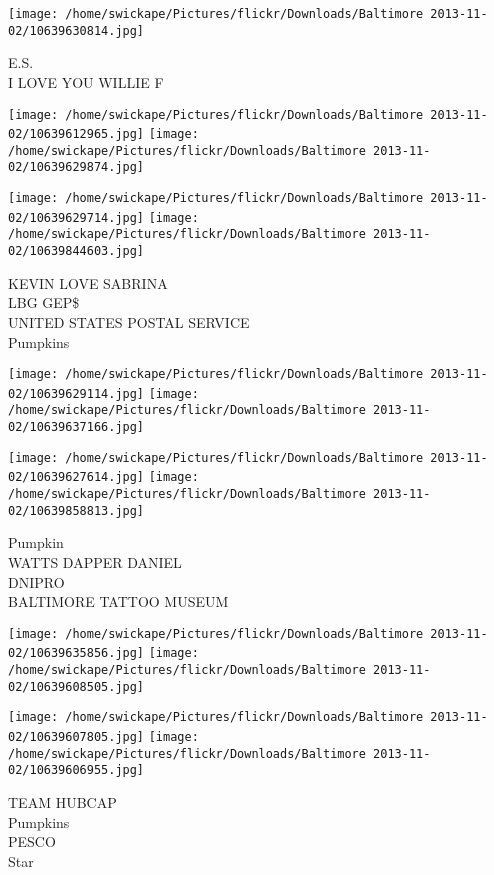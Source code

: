 \documentclass[10pt,letterpaper]{article}
\begin{document}
\vspace{0.25in}
\texttt{[image: /home/swickape/Pictures/flickr/Downloads/Baltimore 2013-11-02/10639630814.jpg]}

E.S.\\
I LOVE YOU WILLIE F
\pagebreak

\texttt{[image: /home/swickape/Pictures/flickr/Downloads/Baltimore 2013-11-02/10639612965.jpg]}
\texttt{[image: /home/swickape/Pictures/flickr/Downloads/Baltimore 2013-11-02/10639629874.jpg]}

\texttt{[image: /home/swickape/Pictures/flickr/Downloads/Baltimore 2013-11-02/10639629714.jpg]}
\texttt{[image: /home/swickape/Pictures/flickr/Downloads/Baltimore 2013-11-02/10639844603.jpg]}

KEVIN LOVE SABRINA\\
LBG GEP\$\\
UNITED STATES POSTAL SERVICE\\
Pumpkins
\pagebreak

\texttt{[image: /home/swickape/Pictures/flickr/Downloads/Baltimore 2013-11-02/10639629114.jpg]}
\texttt{[image: /home/swickape/Pictures/flickr/Downloads/Baltimore 2013-11-02/10639637166.jpg]}

\texttt{[image: /home/swickape/Pictures/flickr/Downloads/Baltimore 2013-11-02/10639627614.jpg]}
\texttt{[image: /home/swickape/Pictures/flickr/Downloads/Baltimore 2013-11-02/10639858813.jpg]}

Pumpkin\\
WATTS DAPPER DANIEL\\
DNIPRO\\
BALTIMORE TATTOO MUSEUM
\pagebreak

\texttt{[image: /home/swickape/Pictures/flickr/Downloads/Baltimore 2013-11-02/10639635856.jpg]}
\texttt{[image: /home/swickape/Pictures/flickr/Downloads/Baltimore 2013-11-02/10639608505.jpg]}

\texttt{[image: /home/swickape/Pictures/flickr/Downloads/Baltimore 2013-11-02/10639607805.jpg]}
\texttt{[image: /home/swickape/Pictures/flickr/Downloads/Baltimore 2013-11-02/10639606955.jpg]}

TEAM HUBCAP\\
Pumpkins\\
PESCO\\
Star
\pagebreak
\end{document}
